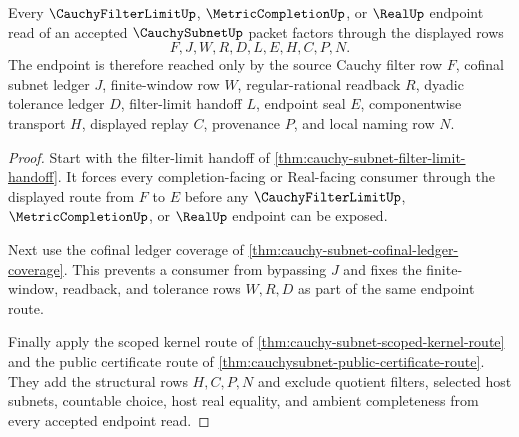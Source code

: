 \begin{theorem}
\label{thm:cauchy-subnet-endpoint-nonescape}
Every $\CauchyFilterLimitUp$, $\MetricCompletionUp$, or $\RealUp$ endpoint read of an accepted $\CauchySubnetUp$ packet factors through the displayed rows
$$
F,J,W,R,D,L,E,H,C,P,N.
$$
The endpoint is therefore reached only by the source Cauchy filter row $F$, cofinal subnet ledger $J$, finite-window row $W$, regular-rational readback $R$, dyadic tolerance ledger $D$, filter-limit handoff $L$, endpoint seal $E$, componentwise transport $H$, displayed replay $C$, provenance $P$, and local naming row $N$.
\end{theorem}
\begin{proof}
Start with the filter-limit handoff of \autoref{thm:cauchy-subnet-filter-limit-handoff}. It forces every completion-facing or Real-facing consumer through the displayed route from $F$ to $E$ before any $\CauchyFilterLimitUp$, $\MetricCompletionUp$, or $\RealUp$ endpoint can be exposed.

Next use the cofinal ledger coverage of \autoref{thm:cauchy-subnet-cofinal-ledger-coverage}. This prevents a consumer from bypassing $J$ and fixes the finite-window, readback, and tolerance rows $W,R,D$ as part of the same endpoint route.

Finally apply the scoped kernel route of \autoref{thm:cauchy-subnet-scoped-kernel-route} and the public certificate route of \autoref{thm:cauchysubnet-public-certificate-route}. They add the structural rows $H,C,P,N$ and exclude quotient filters, selected host subnets, countable choice, host real equality, and ambient completeness from every accepted endpoint read.
\end{proof}

